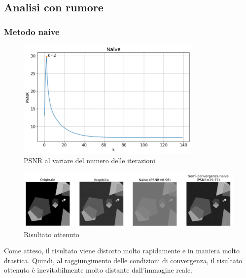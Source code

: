 \documentclass[11pt]{article}
\begin{document}
\subsection{Analisi con rumore}
\subsubsection{Metodo naive}
\begin{figure}[H]
    \centering
    \includegraphics[width=9cm]{semiconvergenza/1/psnr_naive.png}
    \caption{PSNR al variare del numero delle iterazioni}
    \label{fig:semiconv_psnr_naive1}
\end{figure}
\begin{figure}[H]
    \centering
    \includegraphics[width=15cm]{semiconvergenza/1/deblur_naive.png}
    \caption{Risultato ottenuto}
    \label{fig:semiconv_deblur_naive1}
\end{figure}
Come atteso, il risultato viene distorto molto rapidamente e in maniera molto drastica. Quindi, al raggiungimento delle condizioni di convergenza, il risultato ottenuto è inevitabilmente molto distante dall'immagine reale.
\end{document}
